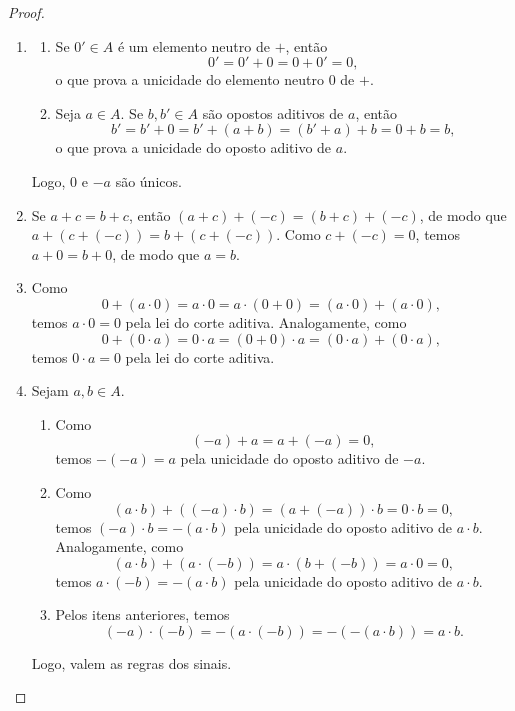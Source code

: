 \begin{proof}
    \leavevmode
        \begin{enumerate}[leftmargin=*, align=left, label=\textbf{(\alph*)}]
            \item 
                \begin{enumerate}[label=\roman*.]
                    \item Se $0' \in A$ é um elemento neutro de $+$, então
                        \[
                            0' = 0' + 0 = 0 + 0' = 0,
                        \]
                    o que prova a unicidade do elemento neutro $0$ de $+$.
                    \item Seja $a \in A$. Se $b, b' \in A$ são opostos aditivos de $a$, então
                        \[
                            b' = b' + 0 = b' + (a+b) = (b' + a) + b = 0 + b = b,
                        \]
                    o que prova a unicidade do oposto aditivo de $a$.
                \end{enumerate}
            Logo, $0$ e $-a$ são únicos. \blackproof
            \item Se $a+c = b+c$, então $(a+c)+(-c) = (b+c)+(-c)$, de modo que $a+(c+(-c)) = b+(c+(-c))$. Como $c+(-c) = 0$, temos $a+0 = b+0$, de modo que $a=b$. \blackproof
            \item Como
                \[
                    0 + (a \cdot 0) = a \cdot 0 = a \cdot (0+0) = (a \cdot 0) + (a \cdot 0),
                \]
            temos $a \cdot 0 = 0$ pela lei do corte aditiva. Analogamente, como
                \[
                    0 + (0 \cdot a) = 0 \cdot a = (0 + 0) \cdot a = (0 \cdot a) + (0 \cdot a),
                \]
            temos $0 \cdot a = 0$ pela lei do corte aditiva. \blackproof
            \item Sejam $a, b \in A$.
                \begin{enumerate}[label=\roman*.]
                    \item Como
                        \[
                            (-a) + a = a + (-a) = 0,
                        \]
                    temos $-(-a) = a$ pela unicidade do oposto aditivo de $-a$.
                    \item Como
                        \[
                            (a \cdot b) + ((-a) \cdot b) = (a + (-a)) \cdot b = 0 \cdot b = 0,
                        \]
                    temos $(-a) \cdot b = -(a \cdot b)$ pela unicidade do oposto aditivo de $a \cdot b$. Analogamente, como
                        \[
                            (a \cdot b) + (a \cdot (-b)) = a \cdot (b + (-b)) = a \cdot 0 = 0,
                        \]
                    temos $a \cdot (-b) = -(a \cdot b)$ pela unicidade do oposto aditivo de $a \cdot b$.
                    \item Pelos itens anteriores, temos
                        \[
                            (-a) \cdot (-b) = -(a \cdot (-b)) = -(-(a \cdot b)) = a \cdot b.
                        \]
                \end{enumerate}
            Logo, valem as regras dos sinais. \blackproof
        \end{enumerate}
\end{proof}

